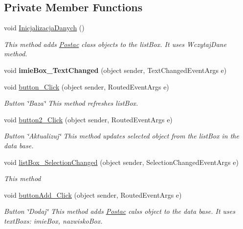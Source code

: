 \subsection*{Private Member Functions}
\begin{DoxyCompactItemize}
\item 
void \hyperlink{class_projekt_p_o_s_1_1_main_window_a1c820b42a3dc4d0baa35192573a3248d}{Inicjalizacja\+Danych} ()
\begin{DoxyCompactList}\small\item\em This method adds \hyperlink{class_projekt_p_o_s_1_1_postac}{Postac} class objects to the list\+Box. It uses Wczytaj\+Dane method. \end{DoxyCompactList}\item 
\mbox{\label{class_projekt_p_o_s_1_1_main_window_af6467cccd96f7169e8a84094d0017c1b}} 
void {\bfseries imie\+Box\+\_\+\+Text\+Changed} (object sender, Text\+Changed\+Event\+Args e)
\item 
void \hyperlink{class_projekt_p_o_s_1_1_main_window_a98a2b1c31cf135c85a3c8bc12a9879ad}{button\+\_\+\+Click} (object sender, Routed\+Event\+Args e)
\begin{DoxyCompactList}\small\item\em Button \char`\"{}\+Baza\char`\"{} This method refreshes list\+Box. \end{DoxyCompactList}\item 
void \hyperlink{class_projekt_p_o_s_1_1_main_window_a955fd8db95c7491807d1262fdb15a115}{button2\+\_\+\+Click} (object sender, Routed\+Event\+Args e)
\begin{DoxyCompactList}\small\item\em Button \char`\"{}\+Aktualizuj\char`\"{} This method updates selected object from the list\+Box in the data base. \end{DoxyCompactList}\item 
void \hyperlink{class_projekt_p_o_s_1_1_main_window_a5b2c07df737c6583f39ba146500523eb}{list\+Box\+\_\+\+Selection\+Changed} (object sender, Selection\+Changed\+Event\+Args e)
\begin{DoxyCompactList}\small\item\em This method \end{DoxyCompactList}\item 
void \hyperlink{class_projekt_p_o_s_1_1_main_window_a0f8ea018177f274247e6d4601fb9e76e}{button\+Add\+\_\+\+Click} (object sender, Routed\+Event\+Args e)
\begin{DoxyCompactList}\small\item\em Button \char`\"{}\+Dodaj\char`\"{} This method adds \hyperlink{class_projekt_p_o_s_1_1_postac}{Postac} calss object to the data base. It uses text\+Boxs\+: imie\+Box, nazwisko\+Box. \end{DoxyCompactList}\item 

\end{DoxyCompactItemize}
